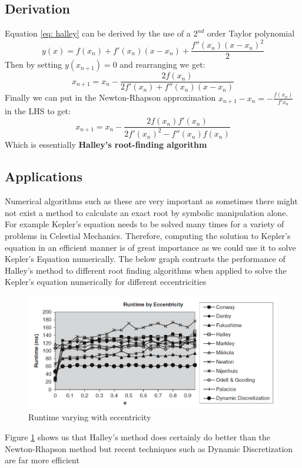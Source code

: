 \subsection{Derivation}
\indent Equation \ref{eq: halley} can be derived by the use of a $2^{nd}$ order Taylor polynomial
\begin{equation}
        y(x) = f(x_{n}) + f'(x_{n})(x-x_{n}) + \frac{f''(x_{n})(x-x_{n})^2}{2}
\end{equation}
Then by setting $y(x_{n+1}) = 0$ and rearranging we get:
\begin{equation}
        x_{n+1} = x_{n} - \frac{2f(x_{n})}{2f'(x_{n}) + f''(x_{n})(x-x_{n})}
\end{equation}
Finally we can put in the Newton-Rhapson approximation
\newline \indent $ x_{n+1}-x_{n} = -\frac{f(x_{n})}{f'{x_n}} $ in the LHS to get:
\begin{equation}
        x_{n+1} = x_{n} - \frac{2f(x_{n})f'(x_{n})}{2f'(x_{n})^2 - f''(x_{n})f(x_n)}
\end{equation}
Which is essentially \textbf{Halley's root-finding algorithm}

\subsection{Applications}
Numerical algorithms such as these are very important as sometimes there might not exist a method to calculate an exact root by symbolic manipulation alone.
\newline For example Kepler's equation needs to be solved many times for a variety of problems in Celestial Mechanics\cite{Fein}. Therefore, computing the solution to Kepler's equation in an efficient manner
is of great importance as we could use it to solve Kepler's Equation numerically\cite{Fein}. The below graph contrasts the performance of Halley's method to different root finding algorithms when
applied to solve the Kepler's equation numerically for different eccentricities \cite{Fein}

\begin{figure}[h]
        \begin{center}
                \includegraphics[scale=0.4]{me20b050.png}
        \end{center}
        \caption{Runtime varying with eccentricity}
        \label{fig: runtime}
\end{figure}

Figure \ref{fig: runtime} shows us that Halley's method does certainly do better than the Newton-Rhapson method but recent techniques such as Dynamic Discretization are far more efficient

\newpage

